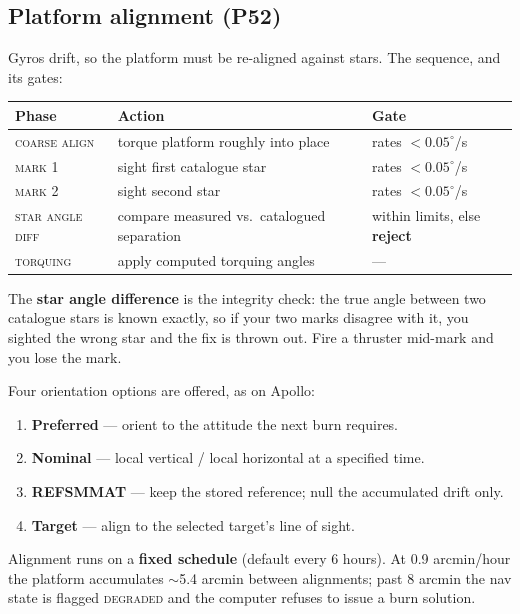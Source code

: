 \documentclass[11pt]{article}
\begin{document}
\subsection{Platform alignment (P52)}
Gyros drift, so the platform must be re-aligned against stars. The sequence, and its gates:
\begin{center}\small
\begin{tabular}{@{}lll@{}}
\toprule
Phase & Action & Gate\\
\midrule
\textsc{coarse align} & torque platform roughly into place & rates $<0.05^\circ$/s\\
\textsc{mark 1} & sight first catalogue star & rates $<0.05^\circ$/s\\
\textsc{mark 2} & sight second star & rates $<0.05^\circ$/s\\
\textsc{star angle diff} & compare measured vs.\ catalogued separation & within limits, else \textbf{reject}\\
\textsc{torquing} & apply computed torquing angles & ---\\
\bottomrule
\end{tabular}
\end{center}
The \textbf{star angle difference} is the integrity check: the true angle between two catalogue stars is known exactly, so if your two marks disagree with it, you sighted the wrong star and the fix is thrown out. Fire a thruster mid-mark and you lose the mark.

Four orientation options are offered, as on Apollo:
\begin{enumerate}\itemsep0pt
\item[\textbf{1}] \textbf{Preferred} --- orient to the attitude the next burn requires.
\item[\textbf{2}] \textbf{Nominal} --- local vertical / local horizontal at a specified time.
\item[\textbf{3}] \textbf{REFSMMAT} --- keep the stored reference; null the accumulated drift only.
\item[\textbf{4}] \textbf{Target} --- align to the selected target's line of sight.
\end{enumerate}
Alignment runs on a \textbf{fixed schedule} (default every 6 hours). At 0.9 arcmin/hour the platform accumulates $\sim$5.4 arcmin between alignments; past 8 arcmin the nav state is flagged \textsc{degraded} and the computer refuses to issue a burn solution.
\end{document}
